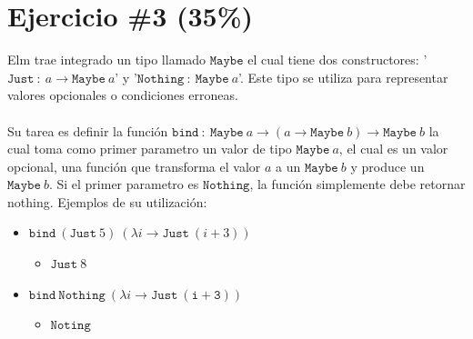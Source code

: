 \documentclass{article}
\begin{document}
\section*{Ejercicio \#3 (35\%)}
Elm trae integrado un tipo llamado $\mathtt{Maybe}$ el cual tiene dos constructores: '$\mathtt{Just}
\ :\ a \rightarrow \mathtt{Maybe}\ a$' y '$\mathtt{Nothing}\ :\ \mathtt{Maybe}\ a$'. Este tipo se
utiliza para representar valores opcionales o condiciones erroneas.
\\\\
Su tarea es definir la funci\'on $\mathtt{bind}\ :\ \mathtt{Maybe}\ a\rightarrow (a\rightarrow \mathtt{Maybe}\ b)
\rightarrow \mathtt{Maybe}\ b$ la cual toma como primer parametro un valor de tipo $\mathtt{Maybe}\ a$, el cual
es un valor opcional, una funci\'on que transforma el valor $a$ a un $\mathtt{Maybe}\ b$ y produce un
$\mathtt{Maybe}\ b$. Si el primer parametro es $\mathtt{Nothing}$, la funci\'on simplemente debe retornar
nothing. Ejemplos de su utilizaci\'on:
\begin{itemize}
        \item{$\mathtt{bind}\ (\mathtt{Just}\ 5)\ (\lambda i\rightarrow \mathtt{Just}\ (i+3))$
                \begin{itemize}
                        \item{$\mathtt{Just}\ 8$}
                \end{itemize}
        }
        \item{$\mathtt{bind}\ \mathtt{Nothing}\ (\lambda i\rightarrow \mathtt{Just\ (i+3)})$
                \begin{itemize}
                        \item{$\mathtt{Noting}$}
                \end{itemize}
        }
\end{itemize}
\end{document}
